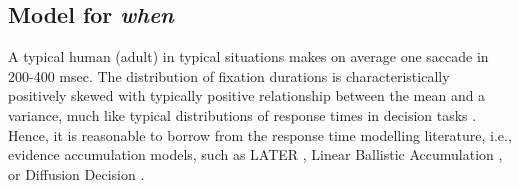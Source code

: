 \documentclass{article}
\begin{document}
\subsection{Model for \textit{when}}

A typical human (adult) in typical situations makes on average one saccade in 200-400 msec. The distribution of fixation durations is characteristically positively skewed with typically positive relationship between the mean and  a variance, much like typical distributions of response times in decision tasks \citep{palmer2011shapes}. Hence, it is reasonable to borrow from the response time modelling literature, i.e., evidence accumulation models, such as LATER \citep{carpenter1995neural}, Linear Ballistic Accumulation \citep{brown2008simplest}, or Diffusion Decision \citep{ratcliff2008diffusion}.



\end{document}
